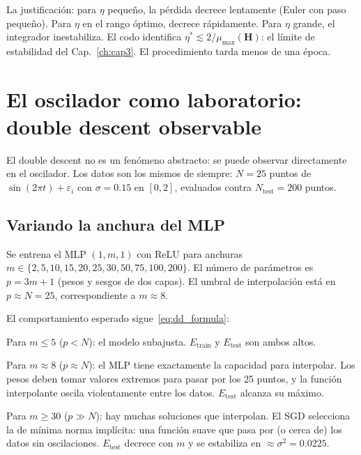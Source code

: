 La justificación: para $\eta$ pequeño, la pérdida decrece lentamente
(Euler con paso pequeño). Para $\eta$ en el rango óptimo, decrece
rápidamente. Para $\eta$ grande, el integrador inestabiliza. El codo
identifica $\eta^* \lesssim 2/\mu_{\max}(\bm{H})$: el límite de
estabilidad del Cap.~\ref{ch:cap3}. El procedimiento tarda menos de una
época.

\section{El oscilador como laboratorio: double descent observable}
\label{sec:oscilador8}


El double descent no es un fenómeno abstracto: se puede observar
directamente en el oscilador. Los datos son los mismos de siempre:
$N = 25$ puntos de $\sin(2\pi t) + \varepsilon_i$ con $\sigma = 0.15$
en $[0, 2]$, evaluados contra $N_{\text{test}} = 200$ puntos.

\subsection{Variando la anchura del MLP}
\label{subsec:osc_anchura}

Se entrena el MLP $(1, m, 1)$ con ReLU para anchuras
$m \in \{2, 5, 10, 15, 20, 25, 30, 50, 75, 100, 200\}$. El número de
parámetros es $p = 3m + 1$ (pesos y sesgos de dos capas). El umbral
de interpolación está en $p \approx N = 25$, correspondiente a
$m \approx 8$.

El comportamiento esperado sigue~\eqref{eq:dd_formula}:

Para $m \leq 5$ ($p < N$): el modelo subajusta. $E_{\text{train}}$ y
$E_{\text{test}}$ son ambos altos.

Para $m \approx 8$ ($p \approx N$): el MLP tiene exactamente la
capacidad para interpolar. Los pesos deben tomar valores extremos para
pasar por los 25 puntos, y la función interpolante oscila violentamente
entre los datos. $E_{\text{test}}$ alcanza su máximo.

Para $m \geq 30$ ($p \gg N$): hay muchas soluciones que interpolan. El
SGD selecciona la de mínima norma implícita: una función suave que pasa
por (o cerca de) los datos sin oscilaciones. $E_{\text{test}}$ decrece
con $m$ y se estabiliza en $\approx \sigma^2 = 0.0225$.

